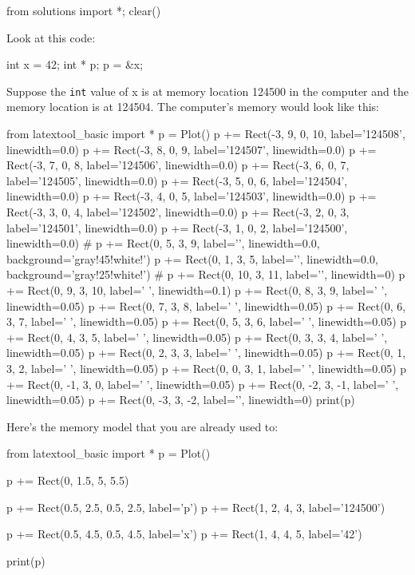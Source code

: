 \begin{python0}
from solutions import *; clear()
\end{python0}

Look at this code:

\begin{consolethree}[escapeinside=||]
int x = 42;
int * p;
p = &x;
\end{consolethree}

Suppose the \texttt{int} value of x is at memory location 124500 in the computer and the memory location is at 124504. The computer's memory would look like this:
\begin{python}
from latextool_basic import *
p = Plot()
p += Rect(-3, 9, 0, 10, label='124508', linewidth=0.0)
p += Rect(-3, 8, 0, 9, label='124507', linewidth=0.0)
p += Rect(-3, 7, 0, 8, label='124506', linewidth=0.0)
p += Rect(-3, 6, 0, 7, label='124505', linewidth=0.0)
p += Rect(-3, 5, 0, 6, label='124504', linewidth=0.0)
p += Rect(-3, 4, 0, 5, label='124503', linewidth=0.0)
p += Rect(-3, 3, 0, 4, label='124502', linewidth=0.0)
p += Rect(-3, 2, 0, 3, label='124501', linewidth=0.0)
p += Rect(-3, 1, 0, 2, label='124500', linewidth=0.0)
#
p += Rect(0, 5, 3, 9, label='', linewidth=0.0, background='gray!45!white!')
p += Rect(0, 1, 3, 5, label='', linewidth=0.0, background='gray!25!white!')
#
p += Rect(0, 10, 3, 11, label='', linewidth=0)
p += Rect(0, 9, 3, 10, label=' ', linewidth=0.1)
p += Rect(0, 8, 3, 9, label=' ', linewidth=0.05)
p += Rect(0, 7, 3, 8, label=' ', linewidth=0.05)
p += Rect(0, 6, 3, 7, label=' ', linewidth=0.05)
p += Rect(0, 5, 3, 6, label=' ', linewidth=0.05)
p += Rect(0, 4, 3, 5, label=' ', linewidth=0.05)
p += Rect(0, 3, 3, 4, label=' ', linewidth=0.05)
p += Rect(0, 2, 3, 3, label=' ', linewidth=0.05)
p += Rect(0, 1, 3, 2, label=' ', linewidth=0.05)
p += Rect(0, 0, 3, 1, label=' ', linewidth=0.05)
p += Rect(0, -1, 3, 0, label=' ', linewidth=0.05)
p += Rect(0, -2, 3, -1, label=' ', linewidth=0.05)
p += Rect(0, -3, 3, -2, label='', linewidth=0)
print(p)
\end{python}

Here's the memory model that you are already used to:

\begin{python}
from latextool_basic import *
p = Plot()

p += Rect(0, 1.5, 5, 5.5)

p += Rect(0.5, 2.5, 0.5, 2.5, label='p')
p += Rect(1, 2, 4, 3, label='124500')

p += Rect(0.5, 4.5, 0.5, 4.5, label='x')
p += Rect(1, 4, 4, 5, label='42')

print(p)
\end{python}

